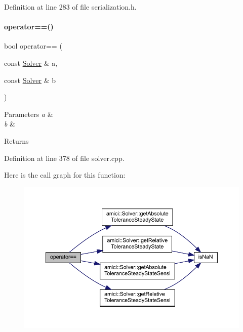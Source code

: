 Definition at line 283 of file serialization.\+h.

\mbox{\label{namespaceamici_a252a116a8f94abccc25b2086deb0734b}} 
\paragraph{\texorpdfstring{operator==()}{operator==()}\hspace{0.1cm}{\footnotesize\ttfamily [2/2]}}
{\footnotesize\ttfamily bool operator== (\begin{DoxyParamCaption}\item[{const \mbox{\hyperlink{classamici_1_1_solver}{Solver}} \&}]{a,  }\item[{const \mbox{\hyperlink{classamici_1_1_solver}{Solver}} \&}]{b }\end{DoxyParamCaption})}


\begin{DoxyParams}{Parameters}
{\em a} & \\
\hline
{\em b} & \\
\hline
\end{DoxyParams}
\begin{DoxyReturn}{Returns}

\end{DoxyReturn}


Definition at line 378 of file solver.\+cpp.

Here is the call graph for this function\+:
\nopagebreak
\begin{figure}[H]
\begin{center}
\leavevmode
\includegraphics[width=350pt]{namespaceamici_a252a116a8f94abccc25b2086deb0734b_cgraph}
\end{center}
\end{figure}
\mbox{\label{namespaceamici_aa6801bbdb0c7625719c019ac287be29e}} 
